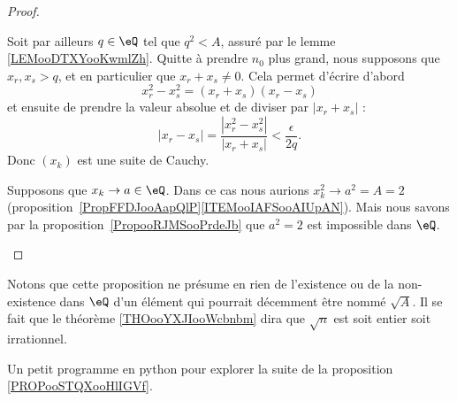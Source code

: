 \begin{proof}
\begin{subproof}
            Soit par ailleurs \( q\in \eQ\) tel que \( q^2<A\), assuré par le lemme \ref{LEMooDTXYooKwmlZh}. Quitte à prendre \( n_0\) plus grand, nous supposons que \( x_r,x_s>q\), et en particulier que \( x_r+x_s\neq 0\). Cela permet d'écrire d'abord
            \begin{equation}
                x_r^2-x_s^2=(x_r+x_s)(x_r-x_s)
            \end{equation}
            et ensuite de prendre la valeur absolue et de diviser par \( | x_r+x_s |\) :
            \begin{equation}
                | x_r-x_s |=\frac{ | x_r^2-x_s^2 | }{ | x_r+x_s | }<\frac{ \epsilon }{ 2q }.
            \end{equation}
            Donc \( (x_k)\) est une suite de Cauchy.
        \item[Pas de convergence pour \( A=2\)]
            Supposons que \( x_k\to a\in \eQ\). Dans ce cas nous aurions \( x_k^2\to a^2=A=2\) (proposition~\ref{PropFFDJooAapQlP}\ref{ITEMooIAFSooAIUpAN}). Mais nous savons par la proposition~\ref{PropooRJMSooPrdeJb} que \( a^2=2\) est impossible dans \( \eQ\).
    \end{subproof}
\end{proof}

Notons que cette proposition ne présume en rien de l'existence ou de la non-existence dans \( \eQ\) d'un élément qui pourrait décemment être nommé \( \sqrt{ A }\). Il se fait que le théorème \ref{THOooYXJIooWcbnbm} dira que \( \sqrt{ n }\) est soit entier soit irrationnel.

\begin{normaltext}
    Un petit programme en python pour explorer la suite de la proposition \ref{PROPooSTQXooHlIGVf}.
    
\end{normaltext}

